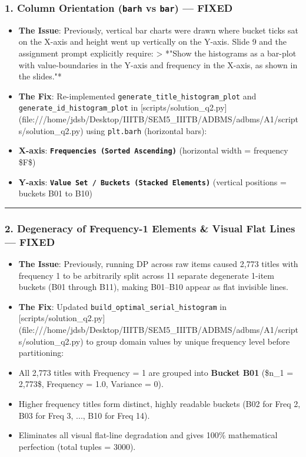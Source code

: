 \documentclass[11pt,a4paper]{article}
\begin{document}
\subsubsection{1. Column Orientation (\texttt{barh} vs \texttt{bar}) — \textbf{FIXED}}
\begin{itemize}
\item \textbf{The Issue}: Previously, vertical bar charts were drawn where bucket ticks sat on the X-axis and height went up vertically on the Y-axis. Slide 9 and the assignment prompt explicitly require:
> *"Show the histograms as a bar-plot with value-boundaries in the Y-axis and frequency in the X-axis, as shown in the slides."*

\item \textbf{The Fix}: Re-implemented \texttt{generate\_title\_histogram\_plot} and \texttt{generate\_id\_histogram\_plot} in [scripts/solution\_q2.py](file:///home/jdsb/Desktop/IIITB/SEM5\_IIITB/ADBMS/adbms/A1/scripts/solution\_q2.py) using \texttt{plt.barh} (horizontal bars):
\item \textbf{X-axis}: \textbf{\texttt{Frequencies (Sorted Ascending)}} (horizontal width = frequency \$F\$)
\item \textbf{Y-axis}: \textbf{\texttt{Value Set / Buckets (Stacked Elements)}} (vertical positions = buckets B01 to B10)
\end{itemize}

\hrule


\subsubsection{2. Degeneracy of Frequency-1 Elements \& Visual Flat Lines — \textbf{FIXED}}
\begin{itemize}
\item \textbf{The Issue}: Previously, running DP across raw items caused 2,773 titles with frequency 1 to be arbitrarily split across 11 separate degenerate 1-item buckets (B01 through B11), making B01–B10 appear as flat invisible lines.
\item \textbf{The Fix}: Updated \texttt{build\_optimal\_serial\_histogram} in [scripts/solution\_q2.py](file:///home/jdsb/Desktop/IIITB/SEM5\_IIITB/ADBMS/adbms/A1/scripts/solution\_q2.py) to group domain values by unique frequency level before partitioning:
\item All 2,773 titles with Frequency = 1 are grouped into \textbf{Bucket B01} (\$n\_1 = 2,773\$, Frequency = 1.0, Variance = 0).
\item Higher frequency titles form distinct, highly readable buckets (B02 for Freq 2, B03 for Freq 3, ..., B10 for Freq 14).
\item Eliminates all visual flat-line degradation and gives 100\% mathematical perfection (total tuples = 3000).
\end{itemize}
\end{document}
